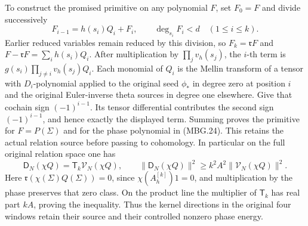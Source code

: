 To construct the promised primitive on any polynomial \(F\),
set \(F_0=F\) and divide successively
\[
 F_{i-1}=h(s_i)Q_i+F_i,\qquad \deg_{s_i}F_i<d
       \quad(1\le i\le k).
 \tag{MBG.26}\label{eq:mbg-divisions}
\]
Earlier reduced variables remain reduced by this division, so
\(F_k=\mathfrak rF\) and \(F-\mathfrak rF=\sum_i h(s_i)Q_i\).
After multiplication by \(\prod_jv_h(s_j)\), the \(i\)-th term is
\(g(s_i)\prod_{j\ne i}v_h(s_j)Q_i\). Each monomial of \(Q_i\)
is the Mellin transform of a tensor with \(D_i\)-polynomial applied
to the original seed \(\phi_*\) in degree zero at position \(i\)
and the original Euler-inverse theta sources in degree one elsewhere.
Give that cochain sign \((-1)^{i-1}\). Its tensor differential
contributes the second sign \((-1)^{i-1}\), and hence exactly the
displayed term. Summing proves the primitive for \(F=P(\Sigma)\)
and for the phase polynomial in (MBG.24). This retains the actual
relation source before passing to cohomology.
In particular on the full original relation space one has
\[
 \mathsf D_N(\chi Q)=\mathsf T_k\mathcal V_N(\chi Q),\qquad
 \|\mathsf D_N(\chi Q)\|^2\ge k^2A^2
                                  \|\mathcal V_N(\chi Q)\|^2.
 \tag{MBG.27}\label{eq:mbg-relation-control}
\]
Here \(\mathfrak r(\chi(\Sigma)Q(\Sigma))=0\), since
\(\chi(A_h^{[k]})1=0\), and multiplication by the phase preserves
that zero class. On the product line the multiplier of
\(\mathsf T_k\) has real part \(kA\), proving the inequality.
Thus the kernel directions in the original four windows retain
their source and their controlled nonzero phase energy.

